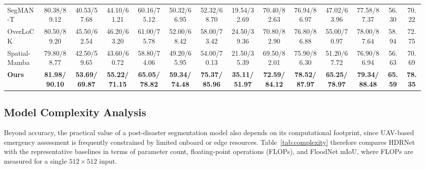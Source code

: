 \documentclass[lettersize,journal]{IEEEtran}
\begin{document}
\begin{table}[!t]
\begin{tabular}{lccccccccccccc}
SegMAN-T\cite{SegMAN} &80.38/89.12 & 40.53/57.68 & 44.10/61.21 & 60.16/75.12 & 50.32/66.95 & 52.32/68.70 & 19.54/32.69 & 70.40/82.63 & 76.94/86.97 & 47.02/63.96 & 77.58/87.37 & 56.30 & 70.22 \\
OverLoCK\cite{lou2025overlock} &80.50/89.20 & 45.50/62.54 & 46.20/63.20 & 61.00/75.78 & 52.00/68.42 & 58.00/73.42 & 24.50/39.36 & 70.80/82.90 & 76.80/86.88 & 55.00/70.97 & 78.00/87.64 & 58.94 & 72.75 \\
Spatial-Mamba\cite{xiao2025spatialmamba} &79.80/88.77 & 42.50/59.65 & 43.60/60.72 & 58.80/74.06 & 49.20/65.95 & 54.00/70.13 & 21.50/35.39 & 69.50/82.01 & 75.90/86.30 & 51.20/67.72 & 76.90/86.94 & 56.63 & 70.69 \\
\hline
\textbf{Ours} & \textbf{81.98/90.10} & \textbf{53.69/69.87} & \textbf{55.22/71.15} & \textbf{65.05/78.82} & \textbf{59.34/74.48} & \textbf{75.37/85.96} & \textbf{35.11/51.97} & \textbf{72.59/84.12} & \textbf{78.52/87.97} & \textbf{65.25/78.97} & \textbf{79.34/88.48} & \textbf{65.59} & \textbf{78.35} \\
\hline
\end{tabular}
\end{table}

\subsection{Model Complexity Analysis}
Beyond accuracy, the practical value of a post-disaster segmentation model also depends on its computational footprint, since UAV-based emergency assessment is frequently constrained by limited onboard or edge resources. Table~\ref{tab:complexity} therefore compares HDRNet with the representative baselines in terms of parameter count, floating-point operations (FLOPs), and FloodNet mIoU, where FLOPs are measured for a single $512\times512$ input.
\end{document}
